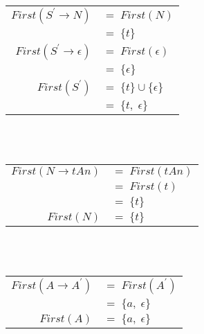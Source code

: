 \documentclass[fleqn]{article}
\begin{document}
\begin{enumerate}
  \begin{tabular}{| r   l |}
  \hline
  $First(S^{\prime} \rightarrow N)$       & $= \; First(N)$                   \\
                                           & $= \; \{t\}$                     \\
  \hline
  $First(S^{\prime} \rightarrow \epsilon)$ & $= \; First(\epsilon)$           \\
                                           & $= \; \{\epsilon\}$              \\
  \hline
  \hline
  $First(S^{\prime})$                      & $= \; \{t\} \cup \{\epsilon\}$   \\
                                           & $= \; \{t, \; \epsilon\}$        \\
  \hline
  \end{tabular}\\\\

  \begin{tabular}{| r   l |}
  \hline
  $First(N \rightarrow t A n)$ & $= \; First(t A n)$ \\
                               & $= \; First(t)$     \\
                               & $= \; \{t\}$        \\
  \hline
  \hline
  $First(N)$                   & $= \; \{t\}$        \\
  \hline
  \end{tabular}\\\\

  \begin{tabular}{| r   l |}
  \hline
  $First(A \rightarrow A^{\prime})$ & $= \; First(A^{\prime})$  \\
                                    & $= \; \{a, \; \epsilon\}$ \\
  \hline
  \hline
  $First(A)$                        & $= \; \{a, \; \epsilon\}$ \\
  \hline
  \end{tabular}\\\\


\end{enumerate}
\end{document}
